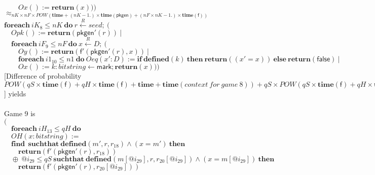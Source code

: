 \documentclass{article}
\newcommand{\store}{\leftarrow}
\newcommand{\getR}{\stackrel{R}{\store}}
\newcommand{\kw}[1]{\mathbf{#1}}
\newcommand{\kwf}[1]{\mathsf{#1}}
\newcommand{\var}[1]{\mathit{#1}}
\newcommand{\kwt}[1]{\mathit{#1}}
\newcommand{\kwp}[1]{\mathit{#1}}
\begin{document}
\begin{tabbing}
$\quad  \quad Ox() := \kw{return}(\var{x})))$\\
$\approx_{\kwp{nK} \times \kwp{nF} \times \var{POW}(\kw{time} + (\kwp{nK} - 1.) \times \kw{time}(\kwf{pkgen}) + (\kwp{nF} \times \kwp{nK} - 1.) \times \kw{time}(\kwf{f}))}$\\
$\kw{foreach}\ \var{iK}_{8} \leq \kwp{nK}\ \kw{do}\ \var{r} \getR seed;\ ($\\
$\quad  Opk() := \kw{return}(\kwf{pkgen'}(\var{r}))\ |$\\
$\quad  \kw{foreach}\ \var{iF}_{9} \leq \kwp{nF}\ \kw{do}\ \var{x} \getR D;\ ($\\
$\quad  \quad Oy() := \kw{return}(\kwf{f'}(\kwf{pkgen'}(\var{r}), \var{x}))\ |$\\
$\quad  \quad \kw{foreach}\ \var{i1}_{10} \leq \kwp{n1}\ \kw{do}\ Oeq(\var{x'}: \kwt{D}) := \kw{if}\ \kw{defined}(\var{k})\ \kw{then}\ \kw{return}((\var{x'}  =  \var{x}))\ \kw{else}\ \kw{return}(\kwf{false})\ |$\\
$\quad  \quad Ox() := \var{k}: \kwt{bitstring} \store \kwf{mark}; \kw{return}(\var{x})))$\\
 {}[Difference of probability $\var{POW}(\kwp{qS} \times \kw{time}(\kwf{f}) + \kwp{qH} \times \kw{time}(\kwf{f}) + \kw{time} + \kw{time}(\mathit{context\ for\ game}\ 8)) + \kwp{qS} \times \var{POW}(\kwp{qS} \times \kw{time}(\kwf{f}) + \kwp{qH} \times \kw{time}(\kwf{f}) + \kw{time} + \kw{time}(\mathit{context\ for\ game}\ 8)) + \kwp{qH} \times \var{POW}(\kwp{qS} \times \kw{time}(\kwf{f}) + \kwp{qH} \times \kw{time}(\kwf{f}) + \kw{time} + \kw{time}(\mathit{context\ for\ game}\ 8))${}]{} yields\\
\\
Game 9 is\\
$($\\
$\quad \kw{foreach}\ \var{iH}_{13} \leq \kwp{qH}\ \kw{do}$\\
$\quad OH(\var{x}: \kwt{bitstring}) :=$\\
$\quad \kw{find}\ \ \kw{suchthat}\ \kw{defined}(\var{m'}, \var{r}, \var{r}_{18})\wedge (\var{x}  =  \var{m'})\ \kw{then}$\\
$\quad \quad \kw{return}\kwf{}(\kwf{f'}(\kwf{pkgen'}(\var{r}), \var{r}_{18}))$\\
$\quad \oplus\ \var{@i}_{29} \leq \kwp{qS}\ \kw{suchthat}\ \kw{defined}(\var{m}[\var{@i}_{29}], \var{r}, \var{r}_{20}[\var{@i}_{29}])\wedge (\var{x}  =  \var{m}[\var{@i}_{29}])\ \kw{then}$\\
$\quad \quad \kw{return}\kwf{}(\kwf{f'}(\kwf{pkgen'}(\var{r}), \var{r}_{20}[\var{@i}_{29}]))$\\

\end{tabbing}
\end{document}
